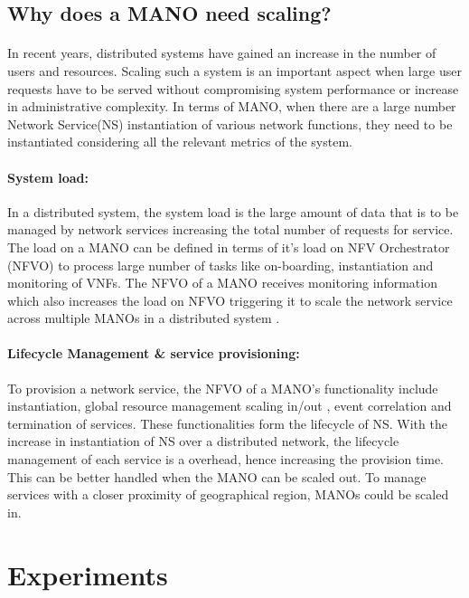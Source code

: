 \subsection{Why does a MANO need scaling?}
\paragraph{}
In recent years, distributed systems have gained an increase in the number of users and resources. Scaling such a system is an important aspect when large user requests have to be served without compromising system performance or increase in administrative complexity. In terms of MANO, when there are a large number Network Service(NS) instantiation of various network functions, they need to be instantiated considering all the relevant metrics of the system.

\paragraph{System load:}
In a distributed system, the system load is the large amount of data that is to be managed by network services increasing the total number of requests for service.
The load on a MANO can be defined in terms of it's load on NFV Orchestrator (NFVO) to process large number of tasks like on-boarding, instantiation and monitoring of VNFs. The NFVO of a MANO receives monitoring information which also increases the load on NFVO triggering it to scale the network service across multiple MANOs in a distributed system \cite{soenen2017optimising}.


\paragraph{Lifecycle Management \& service provisioning:} To provision a network service, the NFVO of a MANO's functionality include instantiation, global resource management scaling in/out , event correlation and termination of services. These functionalities form the lifecycle of NS. With the increase in instantiation of NS over a distributed network, the lifecycle management of each service is a overhead, hence increasing the provision time. This can be better handled when the MANO can be scaled out. To manage services with a closer proximity of geographical region, MANOs could be scaled in.






\section{Experiments}

